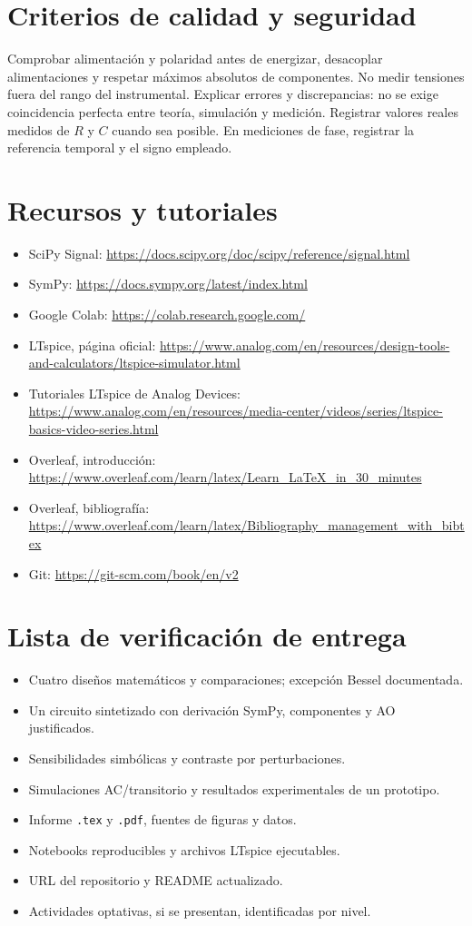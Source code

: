 \documentclass[11pt,a4paper]{article}
\begin{document}
\section{Criterios de calidad y seguridad}
Comprobar alimentación y polaridad antes de energizar, desacoplar alimentaciones y respetar máximos absolutos de componentes. No medir tensiones fuera del rango del instrumental. Explicar errores y discrepancias: no se exige coincidencia perfecta entre teoría, simulación y medición. Registrar valores reales medidos de $R$ y $C$ cuando sea posible. En mediciones de fase, registrar la referencia temporal y el signo empleado.
\section{Recursos y tutoriales}
\begin{itemize}
\item SciPy Signal: \url{https://docs.scipy.org/doc/scipy/reference/signal.html}
\item SymPy: \url{https://docs.sympy.org/latest/index.html}
\item Google Colab: \url{https://colab.research.google.com/}
\item LTspice, página oficial: \url{https://www.analog.com/en/resources/design-tools-and-calculators/ltspice-simulator.html}
\item Tutoriales LTspice de Analog Devices: \url{https://www.analog.com/en/resources/media-center/videos/series/ltspice-basics-video-series.html}
\item Overleaf, introducción: \url{https://www.overleaf.com/learn/latex/Learn_LaTeX_in_30_minutes}
\item Overleaf, bibliografía: \url{https://www.overleaf.com/learn/latex/Bibliography_management_with_bibtex}
\item Git: \url{https://git-scm.com/book/en/v2}
\end{itemize}
\section{Lista de verificación de entrega}
\begin{itemize}
\item[\(\square\)] Cuatro diseños matemáticos y comparaciones; excepción Bessel documentada.
\item[\(\square\)] Un circuito sintetizado con derivación SymPy, componentes y AO justificados.
\item[\(\square\)] Sensibilidades simbólicas y contraste por perturbaciones.
\item[\(\square\)] Simulaciones AC/transitorio y resultados experimentales de un prototipo.
\item[\(\square\)] Informe \texttt{.tex} y \texttt{.pdf}, fuentes de figuras y datos.
\item[\(\square\)] Notebooks reproducibles y archivos LTspice ejecutables.
\item[\(\square\)] URL del repositorio y README actualizado.
\item[\(\square\)] Actividades optativas, si se presentan, identificadas por nivel.
\end{itemize}
\end{document}
